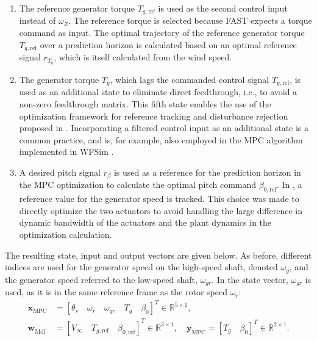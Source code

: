 \begin{enumerate}
    \item The reference generator torque $T_{g,\text{ref}}$ is used as the second control input instead of $\omega_Z$. The reference torque is selected because FAST expects a torque command as input. The optimal trajectory of the reference generator torque $T_{g,\text{ref}}$ over a prediction horizon is calculated based on an optimal reference signal $r_{T_g}$, which is itself calculated from the wind speed.
    \item The generator torque $T_g$, which lags the commanded control signal $T_{g,\text{ref}}$, is used as an additional state to eliminate direct feedthrough, i.e., to avoid a non-zero feedthrough matrix. This fifth state enables the use of the optimization framework for reference tracking and disturbance rejection proposed in \cite{cisneros2020velocity}. Incorporating a filtered control input as an additional state is a common practice, and is, for example, also employed in the MPC algorithm implemented in WFSim \cite{boersma2018control}. %
    \item A desired pitch signal $r_{\beta}$ is used as a reference for the prediction horizon in the MPC optimization to calculate the optimal pitch command $\beta_{0,\text{ref}}$. In \cite{Bianchi2007}, a reference value for the generator speed is tracked. This choice was made to directly optimize the two actuators to avoid handling the large difference in dynamic bandwidth of the actuators and the plant dynamics in the optimization calculation.
\end{enumerate}
%
The resulting state, input and output vectors are given below. As before, different indices are used for the generator speed on the high-speed shaft, denoted $\omega_g$, and the generator speed referred to the low-speed shaft, $\omega_{gr}$. In the state vector, $\omega_{gr}$ is used, as it is in the same reference frame as the rotor speed $\omega_r$:
\begin{equation}\label{eq:xMPCyMPC}
    \begin{aligned}
        \bm{x}_{\text{MPC}} &= [\theta_{s} \quad \omega_r \quad \omega_{gr} \quad T_g \quad \beta_0]^T \in \mathbb{R}^{5 \times 1},\\
        \bm{w}_{\text{Mdl}^\prime} &= [V_{\infty} \quad T_{g,\text{ref}} \quad \beta_{0,\text{ref}}]^T \in \mathbb{R}^{3 \times 1}, \quad
        \bm{y}_{\text{MPC}} = [T_g \quad \beta_0]^T \in \mathbb{R}^{2 \times 1}.
    \end{aligned}
\end{equation}
